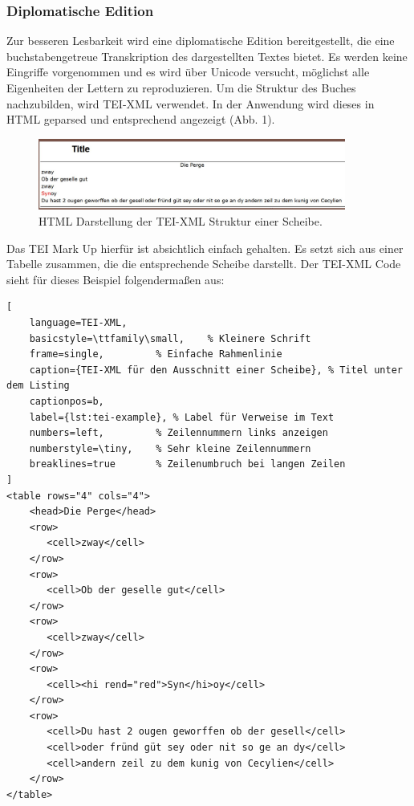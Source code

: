 \documentclass[12pt,a4paper]{article}
\begin{document}
		\subsubsection{Diplomatische Edition}
			Zur besseren Lesbarkeit wird eine diplomatische Edition bereitgestellt, die eine buchstabengetreue 
			Transkription des dargestellten Textes bietet. Es werden keine Eingriffe vorgenommen und es wird über 
			Unicode versucht, möglichst alle Eigenheiten der Lettern zu reproduzieren. Um die Struktur des Buches nachzubilden, 
			wird TEI-XML verwendet. In der Anwendung wird dieses in HTML geparsed und entsprechend angezeigt (Abb. 1).
			\vspace{5pt}
			\begin{figure}[htbp]
				\centering
				\includegraphics[width=0.9\textwidth]{abb-1-tei-parsed.JPG}
				\caption{HTML Darstellung der TEI-XML Struktur einer Scheibe.}
				\label{Abbildung 1}
			\end{figure}
			Das TEI Mark Up hierfür ist absichtlich einfach gehalten. Es setzt sich aus einer Tabelle zusammen, die die entsprechende
			Scheibe darstellt. Der TEI-XML Code sieht für dieses Beispiel folgendermaßen aus:
\vspace{5mm}			

\begin{lstlisting}[
    language=TEI-XML, 
    basicstyle=\ttfamily\small,    % Kleinere Schrift
    frame=single,         % Einfache Rahmenlinie
    caption={TEI-XML für den Ausschnitt einer Scheibe}, % Titel unter dem Listing
	captionpos=b,
    label={lst:tei-example}, % Label für Verweise im Text
    numbers=left,         % Zeilennummern links anzeigen
    numberstyle=\tiny,    % Sehr kleine Zeilennummern
    breaklines=true       % Zeilenumbruch bei langen Zeilen
]
<table rows="4" cols="4">
	<head>Die Perge</head>
	<row>
	   <cell>zway</cell>
	</row>
	<row>
	   <cell>Ob der geselle gut</cell>
	</row>
	<row>
	   <cell>zway</cell>
	</row>
	<row>
	   <cell><hi rend="red">Syn</hi>oy</cell>
	</row>
	<row>
	   <cell>Du hast 2 ougen geworffen ob der gesell</cell>
	   <cell>oder fründ güt sey oder nit so ge an dy</cell>
	   <cell>andern zeil zu dem kunig von Cecylien</cell>
	</row>
</table>
\end{lstlisting}
	
\end{document}
